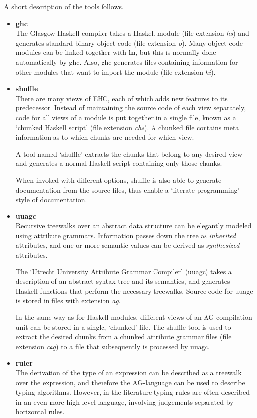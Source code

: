A short description of the tools follows.
\begin{itemize}

\item {\bf ghc}\\
The Glasgow Haskell compiler takes a Haskell module (file extension {\em hs})
and generates standard binary object code (file extension {\em o}).
Many object code modules can be linked together with {\bf ln}, but this
is normally done automatically by ghc.
Also, ghc generates files containing information for other modules that
want to import the module (file extension {\em hi}).

\item {\bf shuffle}\\
There are many views of EHC, each of which adds new features to its predecessor.
Instead of maintaining the source code of each view separately,
code for all views of a module is put together in a single file,
known as a `chunked Haskell script' (file extension {\em chs}).
A chunked file contains meta information as to which chunks 
are needed for which view.

A tool named `shuffle' extracts the chunks that belong to any desired view
and generates a normal Haskell script containing only those chunks.

When invoked with different options, shuffle is also able to 
generate documentation from the source files, thus enable
a `literate programming' style of documentation.

\item {\bf uuagc}\\
Recursive treewalks over an abstract data structure can be elegantly modeled
using attribute grammars. Information passes down the tree as {\em inherited} attributes,
and one or more semantic values can be derived as {\em synthesized} attributes.

The `Utrecht University Attribute Grammar Compiler' (uuagc) takes a description
of an abstract syntax tree and its semantics, and generates Haskell functions
that perform the necessary treewalks.
Source code for uuagc is stored in files with extension {\em ag}.

In the same way as for Haskell modules, different views of an AG compilation unit
can be stored in a single, `chunked' file.
The shuffle tool is used to extract the desired chunks
from a chunked attribute grammar files (file extension {\em cag}) to a file that 
subsequently is processed by uuagc.

\item {\bf ruler}\\
The derivation of the type of an expression can be described as a treewalk
over the expression, and therefore the AG-language can be used to describe
typing algorithms.
However, in the literature typing rules are often described in an even more
high level language, involving judgements separated by horizontal rules.


\end{itemize}
